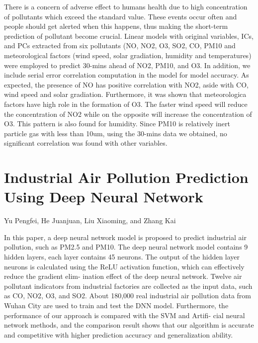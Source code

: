 There is a concern of adverse effect to humans health due
to high concentration of pollutants which exceed the standard
value. These events occur often and people should get alerted
when this happens, thus making the short-term prediction of
pollutant become crucial. Linear models with original
variables, ICs, and PCs extracted from six pollutants (NO,
NO2, O3, SO2, CO, PM10 and meteorological factors (wind
speed, solar gradiation, humidity and temperatures) were
employed to predict 30-mins ahead of NO2, PM10, and O3. In
addition, we include serial error correlation computation in
the model for model accuracy. As expected, the presence of
NO has positive correlation with NO2, aside with CO, wind
speed and solar gradiation. Furthermore, it was shown that
meteorologica factors have high role in the formation of O3.
The faster wind speed will reduce the concentration of NO2
while on the opposite will increase the concentration of O3.
This pattern is also found for humidity. Since PM10 is
relatively inert particle gas with less than 10um, using the
30-mins data we obtained, no significant correlation was
found with other variables.

\section{Industrial Air Pollution Prediction Using Deep Neural Network}

Yu Pengfei, He Juanjuan, Liu Xiaoming, and Zhang Kai

In this paper, a deep neural network model is proposed to
predict industrial air pollution, such as PM2.5 and PM10. The deep
neural network model contains 9 hidden layers, each layer contains 45
neurons. The output of the hidden layer neurons is calculated using the
ReLU activation function, which can effectively reduce the gradient elim-
ination effect of the deep neural network. Twelve air pollutant indicators
from industrial factories are collected as the input data, such as CO,
NO2, O3, and SO2. About 180,000 real industrial air pollution data from
Wuhan City are used to train and test the DNN model. Furthermore,
the performance of our approach is compared with the SVM and Artifi-
cial neural network methods, and the comparison result shows that our
algorithm is accurate and competitive with higher prediction accuracy
and generalization ability.

